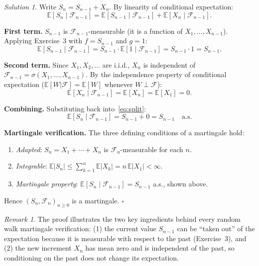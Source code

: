 \documentclass[12pt]{article}
\theoremstyle{remark}
\newtheorem*{solution}{Solution}
\newtheorem*{remark}{Remark}
\newcommand{\E}{\mathbb{E}}
\newcommand{\F}{\mathcal{F}}
\newcommand{\1}{\mathbf{1}}
\begin{document}
\begin{solution}

Write $S_n = S_{n-1} + X_n$.  By linearity of conditional expectation:
\begin{equation}\label{eq:split}
  \E[S_n \mid \F_{n-1}]
  = \E[S_{n-1} \mid \F_{n-1}] + \E[X_n \mid \F_{n-1}].
\end{equation}

\textbf{First term.}  $S_{n-1}$ is $\F_{n-1}$-measurable (it is a function of
$X_1, \ldots, X_{n-1}$).  Applying Exercise~3 with $f = S_{n-1}$ and $g = 1$:
\[
  \E[S_{n-1} \mid \F_{n-1}]
  = S_{n-1} \cdot \E[1 \mid \F_{n-1}]
  = S_{n-1} \cdot 1
  = S_{n-1}.
\]

\textbf{Second term.}  Since $X_1, X_2, \ldots$ are i.i.d., $X_n$ is independent of
$\F_{n-1} = \sigma(X_1, \ldots, X_{n-1})$.  By the independence property of conditional
expectation ($\E[W|\F] = \E[W]$ whenever $W \perp \F$):
\[
  \E[X_n \mid \F_{n-1}] = \E[X_n] = \E[X_1] = 0.
\]

\textbf{Combining.}  Substituting back into~\eqref{eq:split}:
\[
  \E[S_n \mid \F_{n-1}] = S_{n-1} + 0 = S_{n-1} \quad \text{a.s.}
\]

\textbf{Martingale verification.}  The three defining conditions of a martingale hold:
\begin{enumerate}
  \item \textit{Adapted}: $S_n = X_1 + \cdots + X_n$ is $\F_n$-measurable for each $n$.
  \item \textit{Integrable}: $\E|S_n| \le \sum_{k=1}^n \E|X_k| = n\,\E|X_1| < \infty$.
  \item \textit{Martingale property}: $\E[S_n \mid \F_{n-1}] = S_{n-1}$ a.s., shown above.
\end{enumerate}
Hence $(S_n, \F_n)_{n \ge 0}$ is a martingale. \hfill$\square$

\begin{remark}
The proof illustrates the two key ingredients behind every random walk martingale
verification: (1) the current value $S_{n-1}$ can be ``taken out'' of the expectation
because it is measurable with respect to the past (Exercise~3), and (2) the new
increment $X_n$ has mean zero and is independent of the past, so conditioning on the
past does not change its expectation.
\end{remark}

\end{solution}
\end{document}
